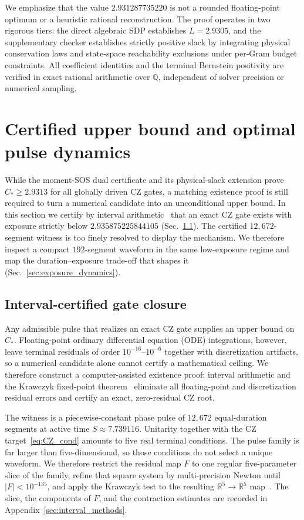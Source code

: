 \documentclass[aps,prx,reprint,nofootinbib,longbibliography,floatfix]{revtex4-2}
\theoremstyle{plain}
\theoremstyle{remark}
\begin{document}
We emphasize that the value $2.931287735220$ is not a rounded floating-point optimum or a heuristic rational reconstruction. The proof operates in two rigorous tiers: the direct algebraic SDP establishes $L = 2.9305$, and the supplementary checker establishes strictly positive slack by integrating physical conservation laws and state-space reachability exclusions under per-Gram budget constraints. All coefficient identities and the terminal Bernstein positivity are verified in exact rational arithmetic over $\mathbb{Q}$, independent of solver precision or numerical sampling.

\section{Certified upper bound and optimal pulse dynamics}
\label{sec:pulse}

While the moment-SOS dual certificate and its physical-slack extension prove $C_* \ge 2.9313$ for all globally driven CZ gates, a matching existence proof is still required to turn a numerical candidate into an unconditional upper bound. In this section we certify by interval arithmetic~\cite{Johansson17} that an exact CZ gate exists with exposure strictly below $2.935875225844105$ (Sec.~\ref{sec:interval_closure}). The certified $12{,}672$-segment witness is too finely resolved to display the mechanism. We therefore inspect a compact $192$-segment waveform in the same low-exposure regime and map the duration--exposure trade-off that shapes it (Sec.~\ref{sec:exposure_dynamics}).

\subsection{Interval-certified gate closure}
\label{sec:interval_closure}
Any admissible pulse that realizes an exact CZ gate supplies an upper bound on $C_*$. Floating-point ordinary differential equation (ODE) integrations, however, leave terminal residuals of order $10^{-16}$--$10^{-6}$ together with discretization artifacts, so a numerical candidate alone cannot certify a mathematical ceiling. We therefore construct a computer-assisted existence proof: interval arithmetic and the Krawczyk fixed-point theorem~\cite{Krawczyk69} eliminate all floating-point and discretization residual errors and certify an exact, zero-residual CZ root.

The witness is a piecewise-constant phase pulse of $12{,}672$ equal-duration segments at active time $S\approx7.739116$. Unitarity together with the CZ target~\eqref{eq:CZ_cond} amounts to five real terminal conditions. The pulse family is far larger than five-dimensional, so those conditions do not select a unique waveform. We therefore restrict the residual map $F$ to one regular five-parameter slice of the family, refine that square system by multi-precision Newton until $\lvert F\rvert<10^{-135}$, and apply the Krawczyk test to the resulting $\mathbb{R}^5\to\mathbb{R}^5$ map~\cite{Krawczyk69}. The slice, the components of $F$, and the contraction estimates are recorded in Appendix~\ref{sec:interval_methods}.
\end{document}
